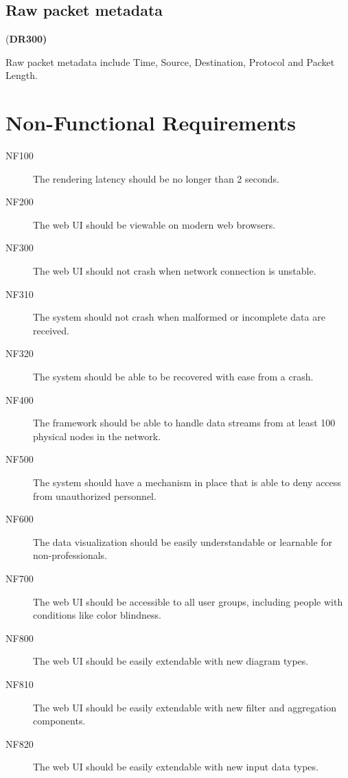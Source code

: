 \documentclass[twoside, english, final]{Pflichtenheft}
\begin{document}
\subsection{Raw packet metadata}(\textbf{DR300)}
\begin{description}
	\item
	      Raw packet metadata include Time, Source, Destination, Protocol and Packet Length.
\end{description}

\section{Non-Functional Requirements}

\begin{description}

	\item[NF100]
	      The rendering latency should be no longer than 2 seconds.

	\item[NF200]
	      The web UI should be viewable on modern web browsers.

	\item[NF300]
	      The web UI should not crash when network connection is unstable.

	\item[NF310]
	      The system should not crash when malformed or incomplete data are received.
	\item[NF320]
	      The system should be able to be recovered with ease from a crash.

	\item[NF400]
	      The framework should be able to handle \glspl{data stream} from at least 100 physical nodes in the network.

	\item[NF500]
	      The system should have a mechanism in place that is able to deny access from unauthorized personnel.

	\item[NF600]
	      The data visualization should be easily understandable or learnable for non-professionals.

	\item[NF700]
	      The web UI should be accessible to all user groups, including people with conditions like color blindness.

	\item[NF800]
	      The web UI should be easily extendable with new diagram types.

	\item[NF810]
	      The web UI should be easily extendable with new filter and aggregation components.

	\item[NF820]
	      The web UI should be easily extendable with new input data types.

\end{description}
\end{document}
